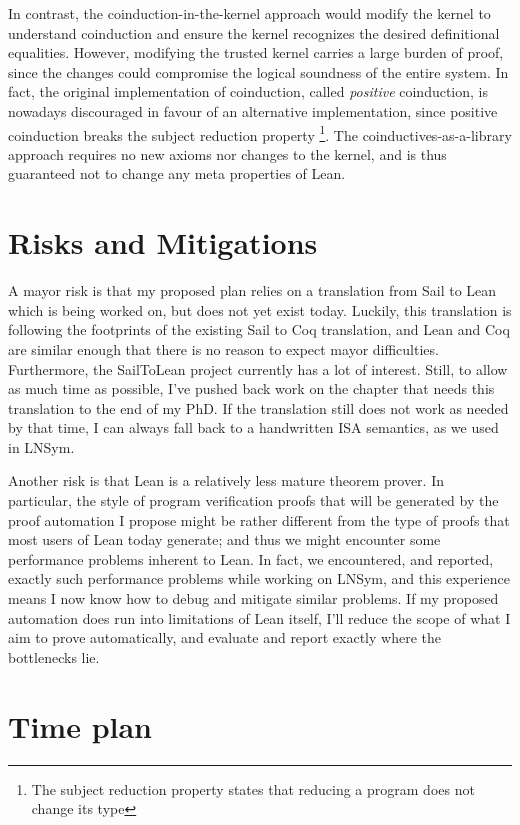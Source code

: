 \documentclass[a4paper]{scrartcl}
\begin{document}
In contrast, the coinduction-in-the-kernel approach would modify the
kernel to understand coinduction and ensure the kernel recognizes the
desired definitional equalities. However, modifying the trusted kernel
carries a large burden of proof, since the changes could compromise the
logical soundness of the entire system. In fact, the original
implementation of coinduction, called \emph{positive} coinduction, is
nowadays discouraged in favour of an alternative implementation, since
positive coinduction breaks the subject reduction property
\footnote{The subject reduction property states that reducing a program
  does not change its type}\cite{sozeauCorrectCompleteType}. The
coinductives-as-a-library approach requires no new axioms nor changes to
the kernel, and is thus guaranteed not to change any meta properties of
Lean.

\section{Risks and Mitigations}

A mayor risk is that my proposed plan relies on a translation from Sail to Lean 
which is being worked on, but does not yet exist today. Luckily, this translation
is following the footprints of the existing Sail to Coq translation, 
and Lean and Coq are similar enough that there is no reason to expect mayor difficulties.
Furthermore, the SailToLean project currently has a lot of interest.
Still, to allow as much time as possible, I've pushed back work on the chapter that needs this
translation to the end of my PhD. If the translation still does not work as needed by that time,
I can always fall back to a handwritten ISA semantics, as we used in LNSym.

Another risk is that Lean is a relatively less mature theorem prover.
In particular, the style of program verification proofs that will be generated by the proof automation
I propose might be rather different from the type of proofs that most users of Lean
today generate; and thus we might encounter some performance problems inherent to Lean.
In fact, we encountered, and reported, exactly such performance problems while working on LNSym, and this experience means I now know how to debug and mitigate similar
problems.
If my proposed automation does run into limitations of Lean itself,
I'll reduce the scope of what I aim to prove automatically, and 
evaluate and report exactly where the bottlenecks lie.


\section{Time plan}\label{timeplan}
\end{document}
